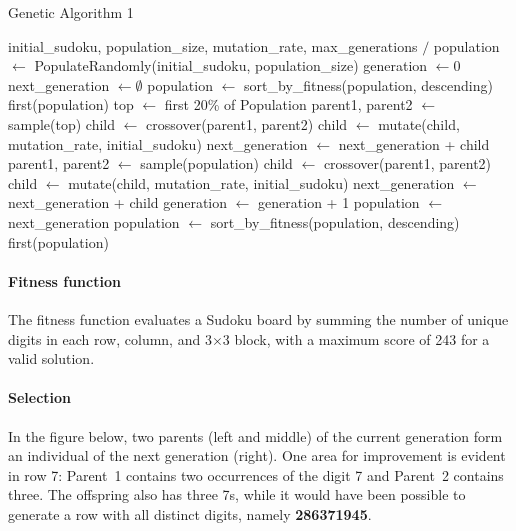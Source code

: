 \begin{algorithm}
\caption{Genetic Algorithm 1}\label{alg:impl-1}
\begin{algorithmic}
\Require initial\_sudoku, population\_size, mutation\_rate, max\_generations
\Ensure $/$
\State population $\gets$ PopulateRandomly(initial\_sudoku, population\_size)
\State generation $\gets 0$
\State next\_generation $\gets \emptyset$
  \State population $\gets$ sort\_by\_fitness(population, descending)
   \State \Return first(population) \EndIf
  \State top $\gets$ first 20\% of Population
    \State parent1, parent2 $\gets$ sample(top)
    \State child $\gets$ crossover(parent1, parent2) 
    \State child $\gets$ mutate(child, mutation\_rate, initial\_sudoku) 
    \State next\_generation $\gets$ next\_generation + child
  \EndFor
    \State parent1, parent2 $\gets$ sample(population)
    \State child $\gets$ crossover(parent1, parent2) 
    \State child $\gets$ mutate(child, mutation\_rate, initial\_sudoku) 
    \State next\_generation $\gets$ next\_generation + child
  \EndFor 
  \State generation $\gets$ generation + 1
  \State population $\gets$ next\_generation
\EndWhile
\State population $\gets$ sort\_by\_fitness(population, descending)
\State \Return first(population)
\end{algorithmic}
\end{algorithm}

\paragraph{Fitness function} The fitness function evaluates a Sudoku board by summing the number of unique digits in each row, column, and 3$\times$3 block, with a maximum score of 243 for a valid solution.

\paragraph{Selection} In the figure below, two parents (left and middle) of the current generation form an individual of the next generation (right).
One area for improvement is evident in row 7: Parent~1 contains two occurrences of the digit 7 and Parent~2 contains three. The offspring also has three 7s, while it would have been possible to generate a row with all distinct digits, namely \textbf{286371945}.

